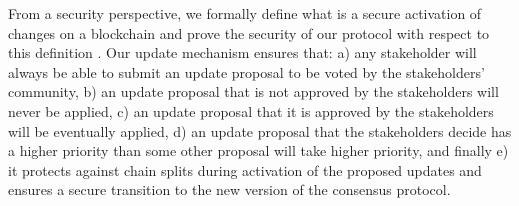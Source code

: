
From a security perspective, we formally define what is a secure
activation of changes on a blockchain and prove the security of our protocol
with respect to this definition \cite{secure_activation}. Our update mechanism
ensures that:
a) any stakeholder will always be able to submit an update proposal to be voted
by the stakeholders' community, b) an update proposal that is not approved by
the stakeholders
 will never be applied, c) an update proposal that it is approved by the
 stakeholders will be eventually applied, d) an update proposal that the
 stakeholders decide has a higher priority than some other proposal will take
 higher priority,
 and finally e) it protects against chain splits during activation of the
 proposed updates and ensures a secure transition to the new version of the
 consensus protocol.

